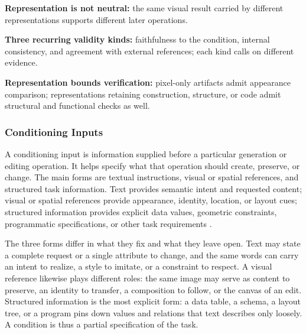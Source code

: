 \begin{keytakeaway}
\begin{keypoints}
  \item \textbf{Representation is not neutral:} the same visual result carried by different representations supports different later operations.
  \item \textbf{Three recurring validity kinds:} faithfulness to the condition, internal consistency, and agreement with external references; each kind calls on different evidence.
  \item \textbf{Representation bounds verification:} pixel-only artifacts admit appearance comparison; representations retaining construction, structure, or code admit structural and functional checks as well.
\end{keypoints}
\end{keytakeaway}

\subsubsection{Conditioning Inputs}

A conditioning input is information supplied before a particular generation or editing operation. It helps specify what that operation should create, preserve, or change. The main forms are textual instructions, visual or spatial references, and structured task information. Text provides semantic intent and requested content; visual or spatial references provide appearance, identity, location, or layout cues; structured information provides explicit data values, geometric constraints, programmatic specifications, or other task requirements \cite{yang2025textimage,wang2025imageediting,yin2025spatiotemporal}.

The three forms differ in what they fix and what they leave open. Text may state a complete request or a single attribute to change, and the same words can carry an intent to realize, a style to imitate, or a constraint to respect. A visual reference likewise plays different roles: the same image may serve as content to preserve, an identity to transfer, a composition to follow, or the canvas of an edit. Structured information is the most explicit form: a data table, a schema, a layout tree, or a program pins down values and relations that text describes only loosely. A condition is thus a partial specification of the task.

